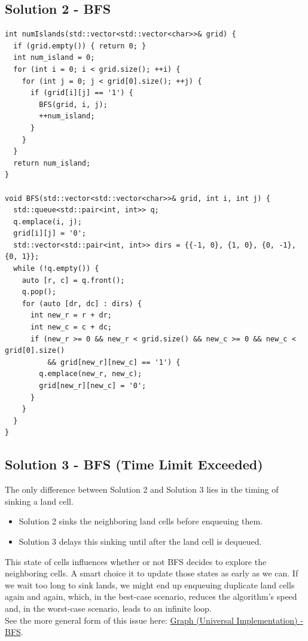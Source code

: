 \subsection*{Solution 2 - BFS}
\begin{lstlisting}
int numIslands(std::vector<std::vector<char>>& grid) {
  if (grid.empty()) { return 0; }
  int num_island = 0;
  for (int i = 0; i < grid.size(); ++i) {
    for (int j = 0; j < grid[0].size(); ++j) {
      if (grid[i][j] == '1') {
        BFS(grid, i, j);
        ++num_island;
      }
    }
  }
  return num_island;
}

void BFS(std::vector<std::vector<char>>& grid, int i, int j) {
  std::queue<std::pair<int, int>> q;
  q.emplace(i, j);
  grid[i][j] = '0';
  std::vector<std::pair<int, int>> dirs = {{-1, 0}, {1, 0}, {0, -1}, {0, 1}};
  while (!q.empty()) {
    auto [r, c] = q.front();
    q.pop();
    for (auto [dr, dc] : dirs) {
      int new_r = r + dr;
      int new_c = c + dc;
      if (new_r >= 0 && new_r < grid.size() && new_c >= 0 && new_c < grid[0].size()
          && grid[new_r][new_c] == '1') {
        q.emplace(new_r, new_c);
        grid[new_r][new_c] = '0';
      }
    }
  }
}
\end{lstlisting}

\subsection*{Solution 3 - BFS (Time Limit Exceeded)}
The only difference between Solution 2 and Solution 3 lies in the timing of sinking a land cell.
\begin{itemize}
\item Solution 2 sinks the neighboring land cells before enqueuing them.
\item Solution 3 delays this sinking until after the land cell is dequeued.
\end{itemize}

This state of cells influences whether or not BFS decides to explore the neighboring cells. A smart choice it to update those states as early as we can. If we wait too long to sink lands, we might end up enqueuing duplicate land cells again and again, which, in the best-case scenario, reduces the algorithm's speed and, in the worst-case scenario, leads to an infinite loop.\\

See the more general form of this issue here: \hyperref[subsubsec:graph_universal_implementation_bfs]{Graph (Universal Implementation) - BFS}.

